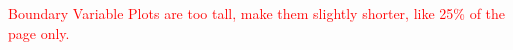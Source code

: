 \documentclass[../../outputs/main.tex]{subfiles}
\begin{document}



\textcolor{red}{Boundary Variable Plots are too tall, make them slightly shorter, like 25\% of the page only.}
\end{document}
